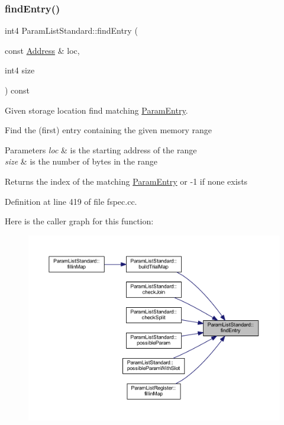\subsubsection{\texorpdfstring{findEntry()}{findEntry()}}
{\footnotesize\ttfamily int4 Param\+List\+Standard\+::find\+Entry (\begin{DoxyParamCaption}\item[{const \mbox{\hyperlink{class_address}{Address}} \&}]{loc,  }\item[{int4}]{size }\end{DoxyParamCaption}) const\hspace{0.3cm}{\ttfamily [protected]}}



Given storage location find matching \mbox{\hyperlink{class_param_entry}{Param\+Entry}}. 

Find the (first) entry containing the given memory range 
\begin{DoxyParams}{Parameters}
{\em loc} & is the starting address of the range \\
\hline
{\em size} & is the number of bytes in the range \\
\hline
\end{DoxyParams}
\begin{DoxyReturn}{Returns}
the index of the matching \mbox{\hyperlink{class_param_entry}{Param\+Entry}} or -\/1 if none exists 
\end{DoxyReturn}


Definition at line 419 of file fspec.\+cc.

Here is the caller graph for this function\+:
\nopagebreak
\begin{figure}[H]
\begin{center}
\leavevmode
\includegraphics[width=350pt]{class_param_list_standard_a8cc59fbeecbf61a1acc32ce2f333788e_icgraph}
\end{center}
\end{figure}
\mbox{\label{class_param_list_standard_a97ad61c3065470a692b401d3234f642a}} 
